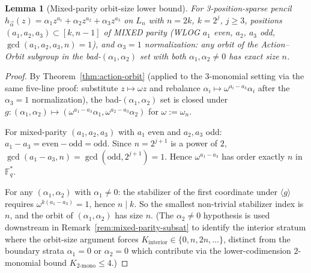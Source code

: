 \documentclass[11pt]{article}
\newtheorem{lemma}[theorem]{Lemma}
\theoremstyle{definition}
\theoremstyle{remark}
\newcommand{\FF}{\mathbb{F}}
\begin{document}
\begin{lemma}[Mixed-parity orbit-size lower bound]
\label{lem:mixed-parity-orbit}
For 3-position-sparse pencil $h_{\vec\alpha}(z) = \alpha_1 z^{a_1} +
\alpha_2 z^{a_2} + \alpha_3 z^{a_3}$ on $L_n$ with $n = 2k$, $k = 2^j$,
$j \geq 3$, positions $(a_1, a_2, a_3) \subset [k, n-1]$ of MIXED parity
(WLOG $a_1$ even, $a_2$, $a_3$ odd, $\gcd(a_1, a_2, a_3, n) = 1$), and
$\alpha_3 = 1$ normalization: any orbit of the Action--Orbit subgroup
in the bad-$(\alpha_1, \alpha_2)$ set with both $\alpha_1, \alpha_2 \neq 0$
has exact size $n$.
\end{lemma}

\begin{proof}
By Theorem~\ref{thm:action-orbit} (applied to the 3-monomial setting via
the same five-line proof: substitute $z \mapsto \omega z$ and rebalance
$\alpha_i \mapsto \omega^{a_i - a_3} \alpha_i$ after the $\alpha_3 = 1$
normalization), the bad-$(\alpha_1, \alpha_2)$ set is closed under
$g: (\alpha_1, \alpha_2) \mapsto (\omega^{a_1 - a_3} \alpha_1,
\omega^{a_2 - a_3} \alpha_2)$ for $\omega := \omega_n$.

For mixed-parity $(a_1, a_2, a_3)$ with $a_1$ even and $a_2, a_3$ odd:
$a_1 - a_3 = \text{even} - \text{odd} = \text{odd}$. Since $n = 2^{j+1}$
is a power of $2$, $\gcd(a_1 - a_3, n) = \gcd(\text{odd}, 2^{j+1}) = 1$.
Hence $\omega^{a_1 - a_3}$ has order exactly $n$ in $\FF_q^*$.

For any $(\alpha_1, \alpha_2)$ with $\alpha_1 \neq 0$: the stabilizer
of the first coordinate under $\langle g \rangle$ requires
$\omega^{k(a_1 - a_3)} = 1$, hence $n \mid k$. So the smallest
non-trivial stabilizer index is $n$, and the orbit of $(\alpha_1, \alpha_2)$
has size $n$. (The $\alpha_2 \neq 0$ hypothesis is used downstream in
Remark~\ref{rem:mixed-parity-subsat} to identify the interior stratum
where the orbit-size argument forces $K_{\text{interior}} \in
\{0, n, 2n, \ldots\}$, distinct from the boundary strata $\alpha_1 = 0$
or $\alpha_2 = 0$ which contribute via the lower-codimension
$2$-monomial bound $K_{2\text{-mono}} \leq 4$.)
\end{proof}
\end{document}
